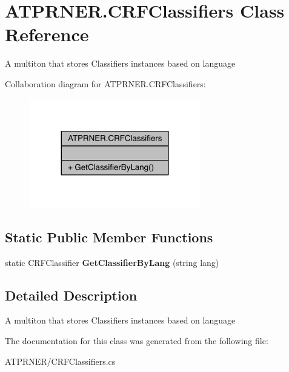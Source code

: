 \hypertarget{class_a_t_p_r_n_e_r_1_1_c_r_f_classifiers}{}\section{A\+T\+P\+R\+N\+E\+R.\+C\+R\+F\+Classifiers Class Reference}
\label{class_a_t_p_r_n_e_r_1_1_c_r_f_classifiers}


A multiton that stores Classifiers instances based on language  




Collaboration diagram for A\+T\+P\+R\+N\+E\+R.\+C\+R\+F\+Classifiers\+:
\nopagebreak
\begin{figure}[H]
\begin{center}
\leavevmode
\includegraphics[width=212pt]{db/d99/class_a_t_p_r_n_e_r_1_1_c_r_f_classifiers__coll__graph}
\end{center}
\end{figure}
\subsection*{Static Public Member Functions}
\begin{DoxyCompactItemize}
\item 
\hypertarget{class_a_t_p_r_n_e_r_1_1_c_r_f_classifiers_a2f3b3220fd6ec5b56c3e6a6b79d81816}{}\label{class_a_t_p_r_n_e_r_1_1_c_r_f_classifiers_a2f3b3220fd6ec5b56c3e6a6b79d81816} 
static C\+R\+F\+Classifier {\bfseries Get\+Classifier\+By\+Lang} (string lang)
\end{DoxyCompactItemize}


\subsection{Detailed Description}
A multiton that stores Classifiers instances based on language 



The documentation for this class was generated from the following file\+:\begin{DoxyCompactItemize}
\item 
A\+T\+P\+R\+N\+E\+R/C\+R\+F\+Classifiers.\+cs\end{DoxyCompactItemize}

